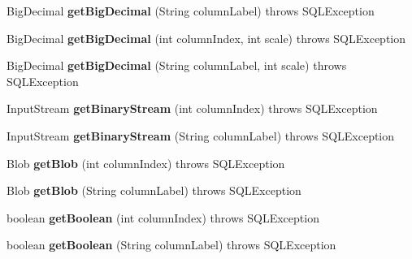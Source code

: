 \begin{DoxyCompactItemize}
Big\+Decimal {\bfseries get\+Big\+Decimal} (String column\+Label)  throws S\+Q\+L\+Exception 
\item 
\mbox{\label{classsimpledb_1_1jdbc_1_1ResultSetAdapter_a887a8fa3f33ec65b9b344f48e69be488}} 
Big\+Decimal {\bfseries get\+Big\+Decimal} (int column\+Index, int scale)  throws S\+Q\+L\+Exception 
\item 
\mbox{\label{classsimpledb_1_1jdbc_1_1ResultSetAdapter_ac9261395de28c2c9e9f85cec138c6364}} 
Big\+Decimal {\bfseries get\+Big\+Decimal} (String column\+Label, int scale)  throws S\+Q\+L\+Exception 
\item 
\mbox{\label{classsimpledb_1_1jdbc_1_1ResultSetAdapter_ae66f7ff35f13cab1802654ba42464141}} 
Input\+Stream {\bfseries get\+Binary\+Stream} (int column\+Index)  throws S\+Q\+L\+Exception 
\item 
\mbox{\label{classsimpledb_1_1jdbc_1_1ResultSetAdapter_a5603418e32da4f99038954cd2bf152c4}} 
Input\+Stream {\bfseries get\+Binary\+Stream} (String column\+Label)  throws S\+Q\+L\+Exception 
\item 
\mbox{\label{classsimpledb_1_1jdbc_1_1ResultSetAdapter_a42fe1a05915af3872357886dd5983131}} 
Blob {\bfseries get\+Blob} (int column\+Index)  throws S\+Q\+L\+Exception 
\item 
\mbox{\label{classsimpledb_1_1jdbc_1_1ResultSetAdapter_ad8f6a1befe9f6d6e183175f91485349a}} 
Blob {\bfseries get\+Blob} (String column\+Label)  throws S\+Q\+L\+Exception 
\item 
\mbox{\label{classsimpledb_1_1jdbc_1_1ResultSetAdapter_a3c91f987541e4c45cc1cbb4187f59b0f}} 
boolean {\bfseries get\+Boolean} (int column\+Index)  throws S\+Q\+L\+Exception 
\item 
\mbox{\label{classsimpledb_1_1jdbc_1_1ResultSetAdapter_a332420facc49947f61a86035de4e214f}} 
boolean {\bfseries get\+Boolean} (String column\+Label)  throws S\+Q\+L\+Exception 

\end{DoxyCompactItemize}
